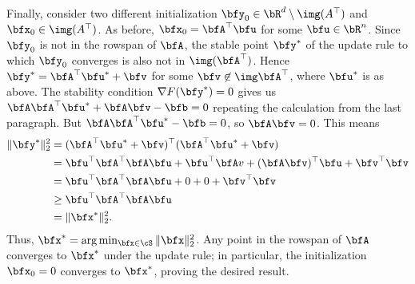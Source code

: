 \begin{homework}[e]
\begin{prf}
\begin{enumerate}[(a)]
        \bigskip

        Finally, consider two different initialization $\bfy_0 \in \bR^d \setminus \img(A^\top)$ and $\bfx_0 \in \img(A^\top)$. As before, $\bfx_0 = \bfA^\top \bfu$ for some $\bfu \in \bR^n$. Since $\bfy_0$ is not in the rowspan of $\bfA$, the stable point $\bfy^*$ of the update rule to which $\bfy_0$ converges is also not in $\img(\bfA^\top)$. Hence $\bfy^* = \bfA^\top \bfu^* + \bfv$ for some $\bfv \not\in \img\bfA^\top$, where $\bfu^*$ is as above. The stability condition $\nabla F(\bfy^*) = 0$ gives us $\bfA\bfA^\top \bfu^* + \bfA\bfv - \bfb = 0$ repeating the calculation from the last paragraph. But $\bfA\bfA^\top \bfu^* - \bfb = 0$, so $\bfA\bfv = 0$. This means
        \begin{align*}
          \|\bfy^*\|^2_2 
            &= (\bfA^\top \bfu^* + \bfv)^\top (\bfA^\top \bfu^* + \bfv) \\
            &= \bfu^\top \bfA^\top \bfA \bfu + \bfu^\top \bfA v + (\bfA\bfv)^\top \bfu + \bfv^\top \bfv \\
            &= \bfu^\top \bfA^\top \bfA \bfu + 0 + 0 + \bfv^\top \bfv \\
            &\geq \bfu^\top \bfA^\top \bfA \bfu \\
            &= \|\bfx^*\|^2_2.
        \end{align*}
        Thus, $\bfx^* = \arg\min_{\bfx\in \cS} \|\bfx\|^2_2$. Any point in the rowspan of $\bfA$ converges to $\bfx^*$ under the update rule; in particular, the initialization $\bfx_0 = 0$ converges to $\bfx^*$, proving the desired result.
    \end{enumerate}
  \end{prf}


\end{homework}
